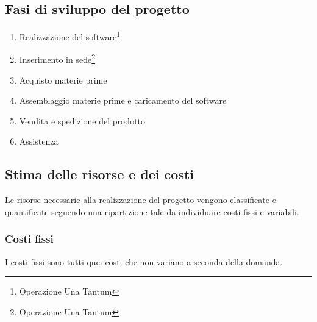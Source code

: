 \subsection{Fasi di sviluppo del progetto}
\begin{enumerate}
\item Realizzazione del software\footnote{Operazione Una Tantum}
\item Inserimento in sede\footnote{Operazione Una Tantum}
\item Acquisto materie prime
\item Assemblaggio materie prime e caricamento del software
\item Vendita e spedizione del prodotto
\item Assistenza
\end{enumerate}
%
%
\subsection{Stima delle risorse e dei costi}
Le risorse necessarie alla realizzazione del progetto vengono classificate e
quantificate  seguendo una ripartizione tale da individuare costi fissi e
variabili.  
%
\subsubsection{Costi fissi}
I costi fissi sono tutti quei costi che non variano a seconda della domanda.

